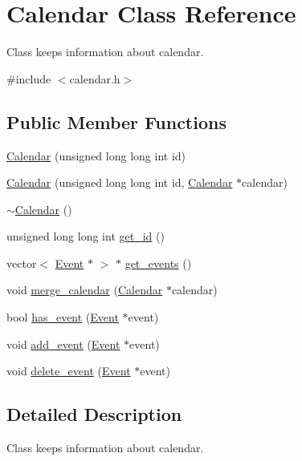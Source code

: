 \hypertarget{classCalendar}{
\section{Calendar Class Reference}
\label{dd/dac/classCalendar}
}


Class keeps information about calendar.  




{\ttfamily \#include $<$calendar.h$>$}

\subsection*{Public Member Functions}
\begin{DoxyCompactItemize}
\item 
\hyperlink{classCalendar_af796f2f9c98608edaf99a6fc1fb610a5}{Calendar} (unsigned long long int id)
\item 
\hyperlink{classCalendar_a9548747afa326135626f552562398edd}{Calendar} (unsigned long long int id, \hyperlink{classCalendar}{Calendar} $\ast$calendar)
\item 
\hyperlink{classCalendar_a23aa939f694874a8f98ec54326d80741}{$\sim$Calendar} ()
\item 
unsigned long long int \hyperlink{classCalendar_a20aaf2566e8e3ef7db419e776672146d}{get\_\-id} ()
\item 
vector$<$ \hyperlink{classEvent}{Event} $\ast$ $>$ $\ast$ \hyperlink{classCalendar_aa1e9611c947c9b37975437b188066bf9}{get\_\-events} ()
\item 
void \hyperlink{classCalendar_a9ed5161b06c2a2acc8e5febbeeeb39b0}{merge\_\-calendar} (\hyperlink{classCalendar}{Calendar} $\ast$calendar)
\item 
bool \hyperlink{classCalendar_a46578e7e3f65bd5d523a108ad00965dd}{has\_\-event} (\hyperlink{classEvent}{Event} $\ast$event)
\item 
void \hyperlink{classCalendar_ad099edd0e82ca0a2ffb18702d029fffa}{add\_\-event} (\hyperlink{classEvent}{Event} $\ast$event)
\item 
void \hyperlink{classCalendar_a305abce38aacb905a0277f573f6b486c}{delete\_\-event} (\hyperlink{classEvent}{Event} $\ast$event)
\end{DoxyCompactItemize}


\subsection{Detailed Description}
Class keeps information about calendar. 

